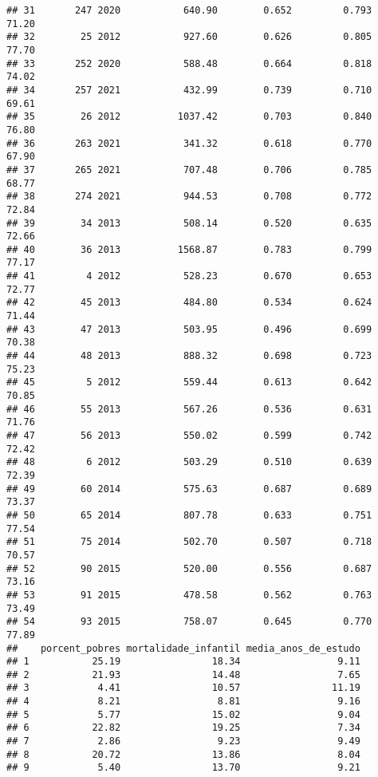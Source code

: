 \documentclass[
]{article}
\begin{document}
\begin{verbatim}
## 31       247 2020           640.90        0.652         0.793             71.20
## 32        25 2012           927.60        0.626         0.805             77.70
## 33       252 2020           588.48        0.664         0.818             74.02
## 34       257 2021           432.99        0.739         0.710             69.61
## 35        26 2012          1037.42        0.703         0.840             76.80
## 36       263 2021           341.32        0.618         0.770             67.90
## 37       265 2021           707.48        0.706         0.785             68.77
## 38       274 2021           944.53        0.708         0.772             72.84
## 39        34 2013           508.14        0.520         0.635             72.66
## 40        36 2013          1568.87        0.783         0.799             77.17
## 41         4 2012           528.23        0.670         0.653             72.77
## 42        45 2013           484.80        0.534         0.624             71.44
## 43        47 2013           503.95        0.496         0.699             70.38
## 44        48 2013           888.32        0.698         0.723             75.23
## 45         5 2012           559.44        0.613         0.642             70.85
## 46        55 2013           567.26        0.536         0.631             71.76
## 47        56 2013           550.02        0.599         0.742             72.42
## 48         6 2012           503.29        0.510         0.639             72.39
## 49        60 2014           575.63        0.687         0.689             73.37
## 50        65 2014           807.78        0.633         0.751             77.54
## 51        75 2014           502.70        0.507         0.718             70.57
## 52        90 2015           520.00        0.556         0.687             73.16
## 53        91 2015           478.58        0.562         0.763             73.49
## 54        93 2015           758.07        0.645         0.770             77.89
##    porcent_pobres mortalidade_infantil media_anos_de_estudo
## 1           25.19                18.34                 9.11
## 2           21.93                14.48                 7.65
## 3            4.41                10.57                11.19
## 4            8.21                 8.81                 9.16
## 5            5.77                15.02                 9.04
## 6           22.82                19.25                 7.34
## 7            2.86                 9.23                 9.49
## 8           20.72                13.86                 8.04
## 9            5.40                13.70                 9.21

\end{verbatim}
\end{document}
